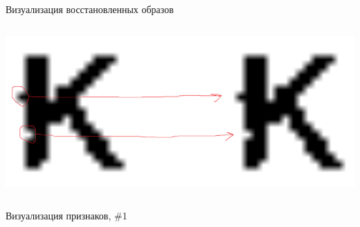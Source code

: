 \documentclass[10pt]{beamer}
\begin{document}
\begin{frame}{Визуализация восстановленных образов}
\begin{columns}
	\includegraphics[width=1\textwidth]{images/rec2.png}
\end{columns}

\end{frame}


\begin{frame}{Визуализация признаков, \#1}


\end{frame}
\end{document}
